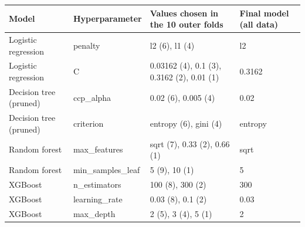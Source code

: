 \begin{tabular}{llp{7cm}l}
\toprule
\textbf{Model} & \textbf{Hyperparameter} & \textbf{Values chosen in the 10 outer folds} & \textbf{Final model (all data)} \\
\midrule
Logistic regression & penalty & l2 (6), l1 (4) & l2 \\
Logistic regression & C & 0.03162 (4), 0.1 (3), 0.3162 (2), 0.01 (1) & 0.3162 \\
Decision tree (pruned) & ccp\_alpha & 0.02 (6), 0.005 (4) & 0.02 \\
Decision tree (pruned) & criterion & entropy (6), gini (4) & entropy \\
Random forest & max\_features & sqrt (7), 0.33 (2), 0.66 (1) & sqrt \\
Random forest & min\_samples\_leaf & 5 (9), 10 (1) & 5 \\
XGBoost & n\_estimators & 100 (8), 300 (2) & 300 \\
XGBoost & learning\_rate & 0.03 (8), 0.1 (2) & 0.03 \\
XGBoost & max\_depth & 2 (5), 3 (4), 5 (1) & 2 \\
\bottomrule
\end{tabular}
